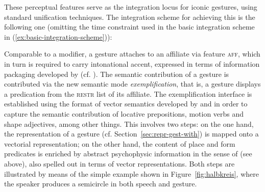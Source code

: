 \documentclass[output=paper
 	        ,biblatex
                ,babelshorthands
                ,newtxmath
                ,draftmode
                ,colorlinks, citecolor=brown
]{langscibook}
\begin{document}
%
These perceptual features serve as the integration locus for iconic gestures, using standard unification techniques. 
%
The integration scheme for achieving this is the following one \citep[]{Luecking:2013:a} (omitting the time constraint used in the basic integration scheme in (\ref{ex:basic-integration-scheme})):
%
\ea \label{ex:sg-ensemble}
\z

Comparable to a modifier, a gesture attaches to an affiliate via feature \textsc{aff},  which in turn is required to carry intonational accent, expressed in terms of information packaging developed by \cite{Engdahl:Vallduvi:1996} (cf. ).
%
The semantic contribution of a gesture is contributed via the new semantic mode  \textit{exemplification}, that is, a gesture displays a predication from the \textsc{restr} list of its affiliate.
%
The exemplification interface is established using the format of vector semantics developed by \citet{Zwarts:Winter:2000} and \citet{Zwarts:2003} in order to capture the semantic contribution of locative prepositions, motion verbs and shape adjectives, among other things.
%
This involves two steps: on the one hand, the representation of a gesture (cf. Section~\ref{sec:repr-gest-with}) is mapped onto a vectorial representation; on the other hand, the content of place and form predicates is enriched by abstract psychophysic information in the sense of \citet{Johansson:1973} (see above), also spelled out in terms of vector representations.
%
Both steps are illustrated by means of the simple example shown in Figure~\ref{fig:halbkreis}, where the speaker produces a semicircle in both speech and gesture.
\end{document}
